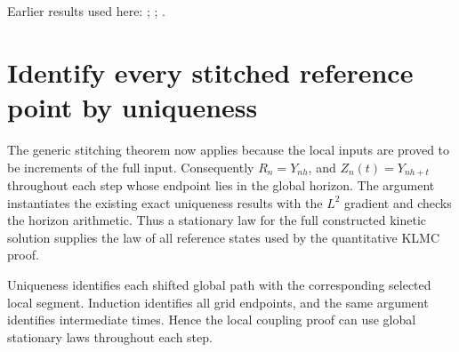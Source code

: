 \documentclass[11pt,a4paper]{article}
\begin{document}
Earlier results used here: \cite[Section~3.13.2]{LangevinLean2026ULASC}; \cite[Section~3.13.5]{LangevinLean2026ULASC}; \cite[Section~3.17.1]{LangevinLean2026ULASC}.

\section{\texorpdfstring{Identify every stitched reference point by uniqueness}{Identify every stitched reference point by uniqueness}}


The generic stitching theorem now applies because the local inputs are proved to be increments of the full input. Consequently \(R_n=Y_{nh}\), and \(Z_n(t)=Y_{nh+t}\) throughout each step whose endpoint lies in the global horizon. The argument instantiates the existing exact uniqueness results with the \(L^{2}\) gradient and checks the horizon arithmetic. Thus a stationary law for the full constructed kinetic solution supplies the law of all reference states used by the quantitative KLMC proof.



Uniqueness identifies each shifted global path with the corresponding selected local segment. Induction identifies all grid endpoints, and the same argument identifies intermediate times. Hence the local coupling proof can use global stationary laws throughout each step.
\end{document}
